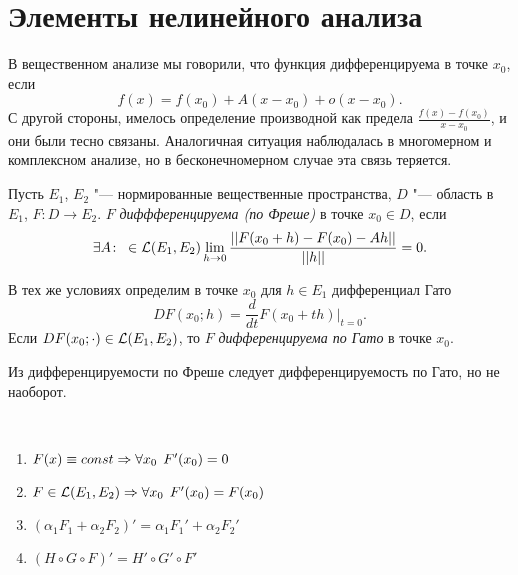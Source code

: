 \documentclass[main]{subfiles}
\begin{document}
\section{Элементы нелинейного анализа}%

В вещественном анализе мы говорили,
что функция дифференцируема в точке \( x_0 \), если
\[
  f(x) = f(x_0) + A (x - x_0) + o(x - x_0).
\]
С другой стороны, имелось определение производной
как предела \( \frac{f(x) - f(x_0)}{x - x_0} \),
и они были тесно связаны.
Аналогичная ситуация наблюдалась в многомерном
и комплексном анализе, но в бесконечномерном
случае эта связь теряется.

\begin{definition}
  Пусть \( E_1 \), \( E_2 \) "--- нормированные вещественные пространства,
  \( D \) "--- область в \( E_1 \), \( F: D \to E_2 \).
  \( F \) \emph{диффференцируема (по Фреше)} в точке \( x_0 \in D \),
  если
  \[
    \Exists{A} \in \Linears{E_1, E_2}
    \lim_{h \to 0} \frac{||F(x_0 + h) - F(x_0) - Ah||}{||h||} = 0.
  \]
\end{definition}

\begin{definition}
  В тех же условиях определим в точке \( x_0 \) для \( h \in E_1 \)
  дифференциал Гато
  \[
    DF(x_0; h) = \frac{d}{dt} F(x_0 + t h) \bigr|_{t=0}.
  \]
  Если \( DF(x_0; \cdot) \in \Linears{E_1, E_2} \),
  то \( F \) \emph{дифференцируема по Гато} в точке \( x_0 \).
\end{definition}

\begin{exercise}
  Из дифференцируемости по Фреше следует дифференцируемость по
  Гато, но не наоборот.
\end{exercise}

\begin{proposition}~
  \begin{enumerate}
    \item \( F(x) \equiv const \Rightarrow \forall {x_0} \; \, F'(x_0) = 0 \)
    \item \( F \in \Linears{E_1, E_2} \To
      \Forall{x_0} F'(x_0) = F(x_0) \)
    \item \( (\alpha_1 F_1 + \alpha_2 F_2)' =
      \alpha_1 F_1' + \alpha_2 F_2' \)
    \item \( (H \circ G \circ F)' = H' \circ G' \circ F' \)
  \end{enumerate}
\end{proposition}
\end{document}
